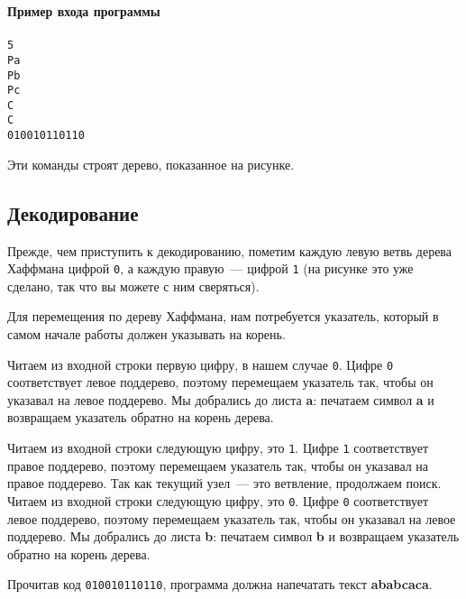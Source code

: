 ﻿\documentclass[a4paper,10pt]{article}
\begin{document}
\noindent\textbf{Пример входа программы}\\
\texttt{ \\
5\\
Pa\\
Pb\\
Pc\\
C\\
C\\
010010110110
}

Эти команды строят дерево, показанное на рисунке.

\subsection*{Декодирование}

Прежде, чем приступить к декодированию, пометим каждую левую ветвь дерева Хаффмана цифрой \texttt{0}, а каждую правую~--- цифрой \texttt{1} (на рисунке это уже сделано, так что вы можете с ним сверяться).

Для перемещения по дереву Хаффмана, нам потребуется указатель, который в самом начале работы должен указывать на корень.

Читаем из входной строки первую цифру, в нашем случае \texttt{0}.
Цифре \texttt{0} соответствует левое поддерево, поэтому перемещаем указатель так, чтобы он указавал на левое поддерево.
Мы добрались до листа \textbf{a}: печатаем символ \textbf{a} и возвращаем указатель обратно на корень дерева.

Читаем из входной строки следующую цифру, это \texttt{1}.
Цифре \texttt{1} соответствует правое поддерево, поэтому перемещаем указатель так, чтобы он указавал на правое поддерево.
Так как текущий узел~--- это ветвление, продолжаем поиск.
Читаем из входной строки следующую цифру, это \texttt{0}.
Цифре \texttt{0} соответствует левое поддерево, поэтому перемещаем указатель так, чтобы он указавал на левое поддерево.
Мы добрались до листа \textbf{b}: печатаем символ \textbf{b} и возвращаем указатель обратно на корень дерева.

Прочитав код \texttt{010010110110}, программа должна напечатать текст \textbf{ababcaca}.
 
\end{document}
